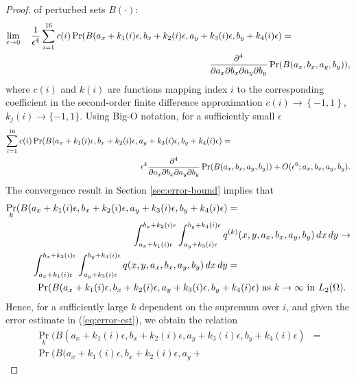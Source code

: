 \begin{proof}
  of perturbed sets $B(\cdot)$:
  \begin{align*}
    \lim_{\epsilon \to 0}\quad \frac{1}{\epsilon^4} \sum_{i=1}^{16} c(i) \Pr(B(a_x + k_1(i)\epsilon, b_x + k_2(i)\epsilon, a_y + k_3(i)\epsilon, b_y + k_4(i)\epsilon) &= \\
    \MoveEqLeft[8] \frac{\partial^4}{\partial a_x \partial b_x \partial a_y \partial b_y} \Pr(B(a_x, b_x, a_y, b_y)),
  \end{align*}
where $c(i)$ and $k(i)$ are functions mapping index $i$ to the
corresponding coefficient in the second-order finite difference
approximation
  $c(i) \to \left\{-1, 1\right\}$, $k_j(i) \to \{-1,1\}$. Using Big-O
  notation, for a sufficiently small $\epsilon$
  \begin{align}
    \sum_{i=1}^{16} c(i) \Pr(B(a_x + k_1(i)\epsilon, b_x +
    k_2(i)\epsilon, a_y + k_3(i)\epsilon, b_y + k_4(i)\epsilon) &= \nonumber \\
    \MoveEqLeft[10] \epsilon^4 \frac{\partial^4}{\partial a_x \partial b_x \partial
      a_y \partial b_y} \Pr(B(a_x, b_x, a_y, b_y)) + O(\epsilon^6 ;
    a_x, b_x, a_y, b_y). \label{eq:fin-diff}
  \end{align}
  The convergence result in Section \ref{sec:error-bound} implies that
  \begin{align*}
    \Pr_k(B(a_x + k_1(i)\epsilon, b_x + k_2(i)\epsilon, a_y +
    k_3(i)\epsilon, b_y + k_4(i)\epsilon) &= \\
    \MoveEqLeft[10] \displaystyle \int_{a_x +
    k_1(i)\epsilon}^{b_x + k_2(i)\epsilon} \displaystyle \int_{a_y + k_3(i)\epsilon}^{b_y +
    k_4(i)\epsilon} q^{(k)}(x,y,a_x,b_x,a_y,b_y)\, dx\, dy \to \\
   \displaystyle
     \int_{a_x + k_1(i)\epsilon}^{b_x + k_2(i)\epsilon} \displaystyle \int_{a_y +
     k_3(i)\epsilon}^{b_y + k_4(i)\epsilon} q(x,y,a_x,b_x,a_y,b_y)\, dx\, dy &= \\
    \MoveEqLeft[20] \Pr(B(a_x + k_1(i)\epsilon, b_x + k_2(i)\epsilon, a_y +
    k_3(i)\epsilon, b_y + k_4(i)\epsilon) \mbox{ as } k \to \infty \mbox{ in } L_2(\Omega).
  \end{align*}
  Hence, for a sufficiently large $k$ dependent on the supremum over
  $i$, and given the error estimate in (\ref{eq:error-est}), we obtain
  the relation
  \begin{align*}
    \Pr_k(B(a_x + k_1(i)\epsilon, b_x + k_2(i)\epsilon, a_y +
    k_3(i)\epsilon, b_y + k_4(i)\epsilon) &= \\
    \Pr(B(a_x + k_1(i)\epsilon, b_x + k_2(i)\epsilon, a_y +

\end{align*}
\end{proof}
